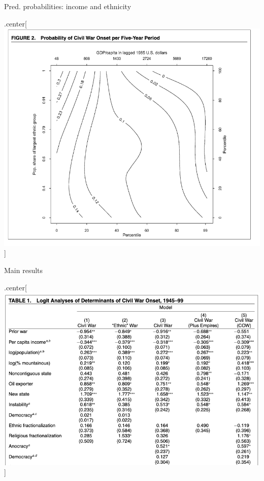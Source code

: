 \documentclass[ignorenonframetext,]{beamer}
\begin{document}
\begin{frame}{Pred. probabilities: income and ethnicity}

\begin{block}{.center{[}\includegraphics{fearon02.png}{]}}

\end{block}

\end{frame}

\begin{frame}{Main results}

\begin{block}{.center{[}\includegraphics{fearon03.png}{]}}

\end{block}

\end{frame}
\end{document}
